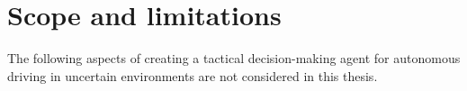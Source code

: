
\section{Scope and limitations}
\label{sec:scope}
The following aspects of creating a tactical decision-making agent for autonomous driving in uncertain environments are not considered in this thesis. 

